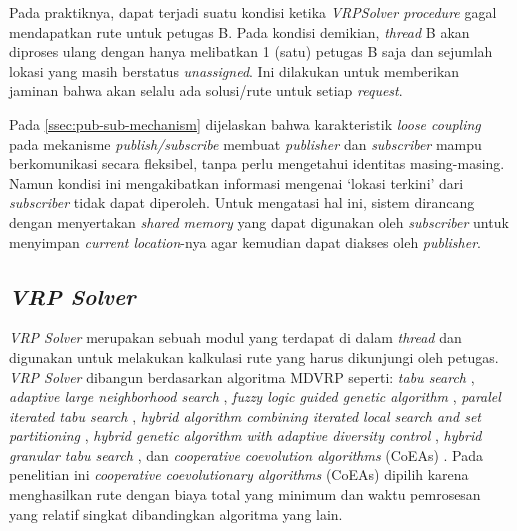 Pada praktiknya, dapat terjadi suatu kondisi ketika \textit{VRPSolver procedure} gagal mendapatkan rute untuk petugas B. Pada kondisi demikian, \textit{thread} B akan diproses ulang dengan hanya melibatkan 1 (satu) petugas B saja dan sejumlah lokasi yang masih berstatus \textit{unassigned}. Ini dilakukan untuk memberikan jaminan bahwa akan selalu ada solusi/rute untuk setiap \textit{request}. 


Pada \autoref{ssec:pub-sub-mechanism} dijelaskan bahwa karakteristik \textit{loose coupling} pada mekanisme \textit{publish/subscribe} membuat \textit{publisher} dan \textit{subscriber} mampu berkomunikasi secara fleksibel, tanpa perlu mengetahui identitas masing-masing. Namun kondisi ini mengakibatkan informasi mengenai `lokasi terkini' dari \textit{subscriber} tidak dapat diperoleh. Untuk mengatasi hal ini, sistem dirancang dengan menyertakan \textit{shared memory} yang dapat digunakan oleh \textit{subscriber} untuk menyimpan \textit{current location}-nya agar kemudian dapat  diakses oleh \textit{publisher}. 


%
%


\subsection{\textit{VRP Solver}}
\label{ssec:vrp-solver}
\textit{VRP Solver} merupakan sebuah modul yang terdapat di dalam \textit{thread} dan digunakan untuk melakukan kalkulasi rute yang harus dikunjungi oleh petugas. \textit{VRP Solver} dibangun berdasarkan algoritma MDVRP seperti: \textit{tabu search} \cite{cordeau_tabu_1997}, \textit{adaptive large neighborhood search}  \citep{pisinger_general_2007}, \textit{fuzzy logic guided genetic algorithm} \citep{lau_application_2010}, \textit{paralel iterated tabu search} \citep{cordeau_parallel_2012}, \textit{hybrid algorithm combining iterated local search and set partitioning} \citep{subramanian_hybrid_2013}, \textit{hybrid genetic algorithm with adaptive diversity control} \citep{vidal_implicit_2014}, \textit{hybrid granular tabu search} \citep{escobar_hybrid_2014}, dan \textit{cooperative coevolution algorithms} (CoEAs) \citep{de_oliveira_cooperative_2016}. Pada penelitian ini \textit{cooperative coevolutionary algorithms} (CoEAs) dipilih karena menghasilkan rute dengan biaya total yang minimum dan waktu pemrosesan yang relatif singkat dibandingkan algoritma yang lain.


